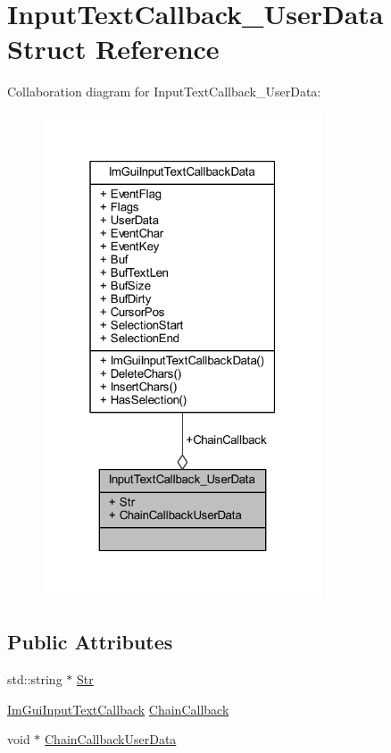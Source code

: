 \hypertarget{struct_input_text_callback___user_data}{}\section{Input\+Text\+Callback\+\_\+\+User\+Data Struct Reference}
\label{struct_input_text_callback___user_data}


Collaboration diagram for Input\+Text\+Callback\+\_\+\+User\+Data\+:
\nopagebreak
\begin{figure}[H]
\begin{center}
\leavevmode
\includegraphics[width=235pt]{struct_input_text_callback___user_data__coll__graph}
\end{center}
\end{figure}
\subsection*{Public Attributes}
\begin{DoxyCompactItemize}
\item 
std\+::string $\ast$ \mbox{\hyperlink{struct_input_text_callback___user_data_af4af934be464cc04c79ee922e697e2d8}{Str}}
\item 
\mbox{\hyperlink{imgui_8h_a65fd2b568a62c9aa2a28a8a13eb65ad7}{Im\+Gui\+Input\+Text\+Callback}} \mbox{\hyperlink{struct_input_text_callback___user_data_af51bd842c8197c249d4e715d4b0991a7}{Chain\+Callback}}
\item 
void $\ast$ \mbox{\hyperlink{struct_input_text_callback___user_data_a67cca931f5a37b65a5088bce64290f80}{Chain\+Callback\+User\+Data}}
\end{DoxyCompactItemize}


